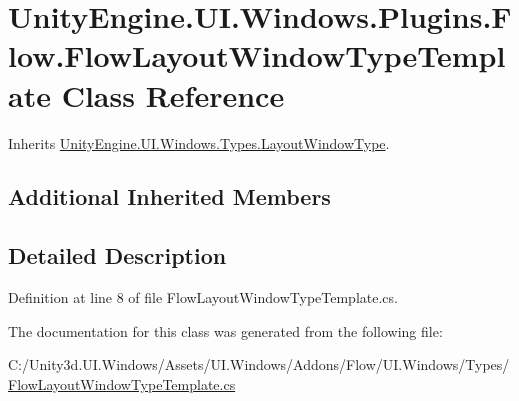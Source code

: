 \hypertarget{class_unity_engine_1_1_u_i_1_1_windows_1_1_plugins_1_1_flow_1_1_flow_layout_window_type_template}{}\section{Unity\+Engine.\+U\+I.\+Windows.\+Plugins.\+Flow.\+Flow\+Layout\+Window\+Type\+Template Class Reference}
\label{class_unity_engine_1_1_u_i_1_1_windows_1_1_plugins_1_1_flow_1_1_flow_layout_window_type_template}


Inherits \hyperlink{class_unity_engine_1_1_u_i_1_1_windows_1_1_types_1_1_layout_window_type}{Unity\+Engine.\+U\+I.\+Windows.\+Types.\+Layout\+Window\+Type}.

\subsection*{Additional Inherited Members}


\subsection{Detailed Description}


Definition at line 8 of file Flow\+Layout\+Window\+Type\+Template.\+cs.



The documentation for this class was generated from the following file\+:\begin{DoxyCompactItemize}
\item 
C\+:/\+Unity3d.\+U\+I.\+Windows/\+Assets/\+U\+I.\+Windows/\+Addons/\+Flow/\+U\+I.\+Windows/\+Types/\hyperlink{_flow_layout_window_type_template_8cs}{Flow\+Layout\+Window\+Type\+Template.\+cs}\end{DoxyCompactItemize}
